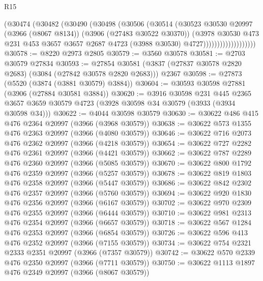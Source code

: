 \begin{lexlean}{R15}
\begin{coremodule}
                          (@30474
                            (@30482
                              (@30490
                                (@30498
                                  (@30506
                                    (@30514
                                      (@30523
                                        @30530
                                        @20997
                                        (@3966 (@8067 @8134))
                                        (@3906 (@27483 @30522 @30370))
                                        (@3978
                                          @30530
                                          @473
                                          @231
                                          @453
                                          @3657
                                          @3657
                                          @2687
                                          @4723
                                          (@3988 @30530)
                                          @4727)))))))))))))))))))
@30578 := @8220 @2973 @2805
@30579 := @3560 @30578
@30581 := @2703 @30579 @27834
@30593 := @27854
    @30581
    (@3837 (@27837 @30578 @2820 @2683) (@3084 (@27842 @30578 @2820 @2683)))
    @2367
@30598 := @27873 (@5520 (@3874 (@3881 @30579) @3884))
@30604 := @30593 @30598 @27881 (@3906 (@27884 @30581 @3884))
@30620 := @3916
    @30598
    @231
    @445
    @2365
    @3657
    @3659
    @30579
    @4723
    (@3928 @30598 @34 @30579 (@3933 (@3934 @30598 @34)))
@30622 := @4044 @30598 @30579
@30630 := @30622 @486 @415 @476 @2364 @20997 (@3966 (@3968 @30579))
@30638 := @30622 @573 @1355 @476 @2363 @20997 (@3966 (@4080 @30579))
@30646 := @30622 @716 @2073 @476 @2362 @20997 (@3966 (@4218 @30579))
@30654 := @30622 @727 @2282 @476 @2361 @20997 (@3966 (@4421 @30579))
@30662 := @30622 @787 @2289 @476 @2360 @20997 (@3966 (@5085 @30579))
@30670 := @30622 @800 @1792 @476 @2359 @20997 (@3966 (@5257 @30579))
@30678 := @30622 @819 @1803 @476 @2358 @20997 (@3966 (@5447 @30579))
@30686 := @30622 @842 @2302 @476 @2357 @20997 (@3966 (@5760 @30579))
@30694 := @30622 @920 @1830 @476 @2356 @20997 (@3966 (@6167 @30579))
@30702 := @30622 @970 @2309 @476 @2355 @20997 (@3966 (@6444 @30579))
@30710 := @30622 @981 @2313 @476 @2354 @20997 (@3966 (@6657 @30579))
@30718 := @30622 @567 @1284 @476 @2353 @20997 (@3966 (@6854 @30579))
@30726 := @30622 @596 @413 @476 @2352 @20997 (@3966 (@7155 @30579))
@30734 := @30622 @754 @2321 @2333 @2351 @20997 (@3966 (@7357 @30579))
@30742 := @30622 @570 @2339 @476 @2350 @20997 (@3966 (@7711 @30579))
@30750 := @30622 @1113 @1897 @476 @2349 @20997 (@3966 (@8067 @30579))

\end{coremodule}
\end{lexlean}
